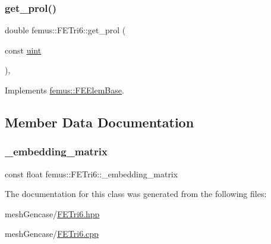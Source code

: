 \mbox{\label{classfemus_1_1_f_e_tri6_a8e08d8a2985f51295992730f2d13c299}} 
\subsubsection{\texorpdfstring{get\+\_\+prol()}{get\_prol()}}
{\footnotesize\ttfamily double femus\+::\+F\+E\+Tri6\+::get\+\_\+prol (\begin{DoxyParamCaption}\item[{const \mbox{\hyperlink{_typedefs_8hpp_a91ad9478d81a7aaf2593e8d9c3d06a14}{uint}}}]{ }\end{DoxyParamCaption})\hspace{0.3cm}{\ttfamily [inline]}, {\ttfamily [virtual]}}



Implements \mbox{\hyperlink{classfemus_1_1_f_e_elem_base_ac82326cdc7cb02329c7be9547d56fad4}{femus\+::\+F\+E\+Elem\+Base}}.



\subsection{Member Data Documentation}
\mbox{\label{classfemus_1_1_f_e_tri6_a7d8121c60698e43c7fdd3652f8224255}} 
\subsubsection{\texorpdfstring{\+\_\+embedding\+\_\+matrix}{\_embedding\_matrix}}
{\footnotesize\ttfamily const float femus\+::\+F\+E\+Tri6\+::\+\_\+embedding\+\_\+matrix\hspace{0.3cm}{\ttfamily [static]}}



The documentation for this class was generated from the following files\+:\begin{DoxyCompactItemize}
\item 
mesh\+Gencase/\mbox{\hyperlink{_f_e_tri6_8hpp}{F\+E\+Tri6.\+hpp}}\item 
mesh\+Gencase/\mbox{\hyperlink{_f_e_tri6_8cpp}{F\+E\+Tri6.\+cpp}}\end{DoxyCompactItemize}
